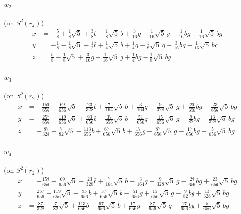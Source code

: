 \documentclass[11pt]{article}
\theoremstyle{remark}
\begin{document}
{\paragraph{$w_{2}$} (on $S^2(r_2)$)
\begin{align*}
x&=-\tfrac{5}{8}+\tfrac{1}{8}\sqrt5+\tfrac{3}{8}b-\tfrac{1}{8}\sqrt5\,b+\tfrac{3}{16}g-\tfrac{1}{16}\sqrt5\,g+\tfrac{1}{16}bg-\tfrac{1}{16}\sqrt5\,bg\\
y&=-\tfrac{1}{8}-\tfrac{1}{8}\sqrt5-\tfrac{1}{2}b+\tfrac{1}{4}\sqrt5\,b+\tfrac{1}{4}g-\tfrac{1}{8}\sqrt5\,g+\tfrac{3}{16}bg-\tfrac{1}{16}\sqrt5\,bg\\
z&=\tfrac{5}{8}-\tfrac{1}{8}\sqrt5+\tfrac{3}{16}g+\tfrac{1}{16}\sqrt5\,g+\tfrac{1}{4}bg-\tfrac{1}{8}\sqrt5\,bg
\end{align*}

\paragraph{$w_{3}$} (on $S^2(r_2)$)
\begin{align*}
x&=-\tfrac{159}{656}-\tfrac{69}{656}\sqrt5-\tfrac{23}{328}b+\tfrac{7}{164}\sqrt5\,b+\tfrac{3}{164}g-\tfrac{9}{328}\sqrt5\,g+\tfrac{29}{656}bg-\tfrac{23}{656}\sqrt5\,bg\\
y&=-\tfrac{257}{656}+\tfrac{119}{656}\sqrt5+\tfrac{93}{656}b-\tfrac{37}{656}\sqrt5\,b-\tfrac{51}{656}g+\tfrac{15}{656}\sqrt5\,g-\tfrac{9}{82}bg+\tfrac{13}{328}\sqrt5\,bg\\
z&=-\tfrac{87}{328}+\tfrac{7}{82}\sqrt5-\tfrac{113}{656}b+\tfrac{67}{656}\sqrt5\,b+\tfrac{17}{656}g-\tfrac{87}{656}\sqrt5\,g-\tfrac{17}{656}bg+\tfrac{5}{656}\sqrt5\,bg
\end{align*}

\paragraph{$w_{4}$} (on $S^2(r_2)$)
\begin{align*}
x&=-\tfrac{159}{656}-\tfrac{69}{656}\sqrt5-\tfrac{23}{328}b+\tfrac{7}{164}\sqrt5\,b-\tfrac{3}{164}g+\tfrac{9}{328}\sqrt5\,g-\tfrac{29}{656}bg+\tfrac{23}{656}\sqrt5\,bg\\
y&=\tfrac{257}{656}-\tfrac{119}{656}\sqrt5-\tfrac{93}{656}b+\tfrac{37}{656}\sqrt5\,b-\tfrac{51}{656}g+\tfrac{15}{656}\sqrt5\,g-\tfrac{9}{82}bg+\tfrac{13}{328}\sqrt5\,bg\\
z&=\tfrac{87}{328}-\tfrac{7}{82}\sqrt5+\tfrac{113}{656}b-\tfrac{67}{656}\sqrt5\,b+\tfrac{17}{656}g-\tfrac{87}{656}\sqrt5\,g-\tfrac{17}{656}bg+\tfrac{5}{656}\sqrt5\,bg
\end{align*}

}
\end{document}
